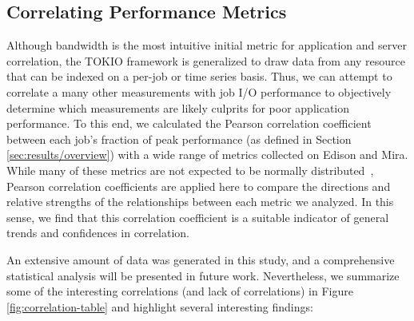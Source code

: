 \subsection{Correlating Performance Metrics} \label{sec:results/correlating}

Although bandwidth is the most intuitive initial metric for application and server
correlation,  
the TOKIO framework is generalized to draw data from any resource that can be indexed on a per-job or time series basis.
Thus, we can attempt to correlate a many other measurements with job
I/O performance to objectively determine which measurements are likely
culprits for poor application performance.
%
To this end, we calculated the Pearson correlation coefficient between each job's fraction of peak performance (as defined in Section \ref{sec:results/overview}) with a wide range of metrics collected on Edison and Mira.
While many of these metrics are not expected to be normally distributed~\cite{Kim2010}, Pearson correlation coefficients are applied here to compare the directions and relative strengths of the relationships between each metric we analyzed.
In this sense, we find that this correlation coefficient is a suitable indicator of general trends and confidences in correlation.

An extensive amount of data was generated in this study, and a comprehensive statistical analysis will be presented in future work.
Nevertheless, we summarize some of the interesting correlations (and lack of correlations) in Figure \ref{fig:correlation-table} and highlight several interesting findings:

